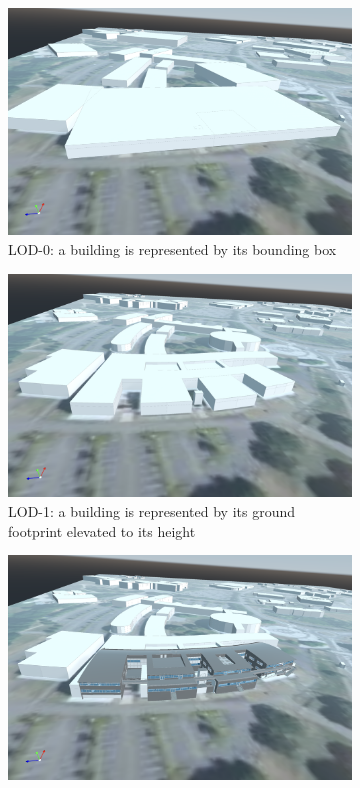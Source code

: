 \documentclass[runningheads]{llncs}
\begin{document}
\begin{figure}[htbp]
\centering
\begin{subfigure}{.4\textwidth}
  \centering
  \includegraphics[width=\linewidth]{images/buildings-lod0.png}
  \caption{LOD-0: a building is represented by its bounding box}
  \label{fig:building-lod0}
\end{subfigure}%
\begin{subfigure}{.4\textwidth}
  \centering
  \includegraphics[width=\linewidth]{images/buildings-lod1.png}
  \caption{LOD-1: a building is represented by its ground footprint elevated to its height}
  \label{fig:building-lod1}
\end{subfigure}
\begin{subfigure}{.4\textwidth}
  \centering
  \includegraphics[width=\linewidth]{images/buildings-lod2.png}

\end{subfigure}
\end{figure}
\end{document}
